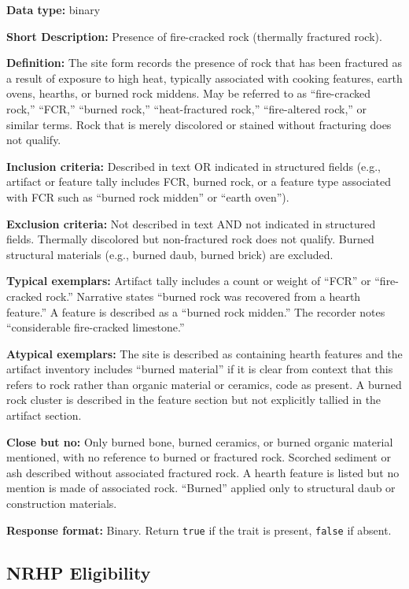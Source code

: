 \documentclass[
]{article}
\begin{document}
\textbf{Data type:} binary

\textbf{Short Description:} Presence of fire-cracked rock (thermally
fractured rock).

\textbf{Definition:} The site form records the presence of rock that has
been fractured as a result of exposure to high heat, typically
associated with cooking features, earth ovens, hearths, or burned rock
middens. May be referred to as ``fire-cracked rock,'' ``FCR,'' ``burned
rock,'' ``heat-fractured rock,'' ``fire-altered rock,'' or similar
terms. Rock that is merely discolored or stained without fracturing does
not qualify.

\textbf{Inclusion criteria:} Described in text OR indicated in
structured fields (e.g., artifact or feature tally includes FCR, burned
rock, or a feature type associated with FCR such as ``burned rock
midden'' or ``earth oven'').

\textbf{Exclusion criteria:} Not described in text AND not indicated in
structured fields. Thermally discolored but non-fractured rock does not
qualify. Burned structural materials (e.g., burned daub, burned brick)
are excluded.

\textbf{Typical exemplars:} Artifact tally includes a count or weight of
``FCR'' or ``fire-cracked rock.'' Narrative states ``burned rock was
recovered from a hearth feature.'' A feature is described as a ``burned
rock midden.'' The recorder notes ``considerable fire-cracked
limestone.''

\textbf{Atypical exemplars:} The site is described as containing hearth
features and the artifact inventory includes ``burned material'' if it
is clear from context that this refers to rock rather than organic
material or ceramics, code as present. A burned rock cluster is
described in the feature section but not explicitly tallied in the
artifact section.

\textbf{Close but no:} Only burned bone, burned ceramics, or burned
organic material mentioned, with no reference to burned or fractured
rock. Scorched sediment or ash described without associated fractured
rock. A hearth feature is listed but no mention is made of associated
rock. ``Burned'' applied only to structural daub or construction
materials.

\textbf{Response format:} Binary. Return \texttt{true} if the trait is
present, \texttt{false} if absent.

\subsection{NRHP Eligibility}\label{nrhp-eligibility}
\end{document}
